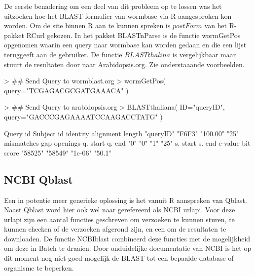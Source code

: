 \documentclass[a4paper]{article}
\begin{document}
De eerste benadering om een deel van dit probleem op te lossen was het uitzoeken hoe het BLAST formulier van wormbase\cite{Wormbase} via R aangesproken kon worden. Om de site binnen R aan te kunnen spreken is $postForm$ van het R-pakket RCurl\cite{RCurl} gekozen. In het pakket BLASTnParse is de functie wormGetPos opgenomen waarin een query naar wormbase kan worden gedaan en die een lijst teruggeeft aan de gebruiker. De functie $BLASTthalina$ is vergelijkbaar maar stuurt de resultaten door naar Arabidopsis.org\cite{Arab}. Zie onderstaaande voorbeelden.

\begin{Schunk}
\begin{Sinput}
> ## Send Query to wormblast.org
> wormGetPos( query="TCGAGACGCGATGAAACA" )
\end{Sinput}
\begin{Sinput}
> ## Send Query to arabidopsis.org
> BLASTthaliana( ID="queryID", query="GACCCGAGAAAATCCAAGACCTATG" )
\end{Sinput}
\begin{Soutput}
        Query id       Subject id         identity alignment length 
       "queryID"           "F6F3"         "100.00"             "25" 
      mismatches     gap openings         q. start           q. end 
             "0"              "0"              "1"             "25" 
        s. start           s. end          e-value        bit score 
         "58525"          "58549"          "1e-06"           "50.1" 
\end{Soutput}
\end{Schunk}

\subsection*{NCBI Qblast}
Een in potentie meer generieke oplossing is het vanuit R aanspreken van Qblast\cite{qblast}. Naast Qblast word hier ook wel naar gerefereerd als NCBI urlapi. Voor deze urlapi zijn een aantal functies geschreven om verzoeken te kunnen sturen, te kunnen checken of de verzoeken afgerond zijn, en een om de resultaten te downloaden. De functie NCBIblast combineerd deze functies met de mogelijkheid om deze in Batch te draaien. Door onduidelijke documentatie van NCBI is het op dit moment nog niet goed mogelijk de BLAST tot een bepaalde database of organisme te beperken.
\end{document}
